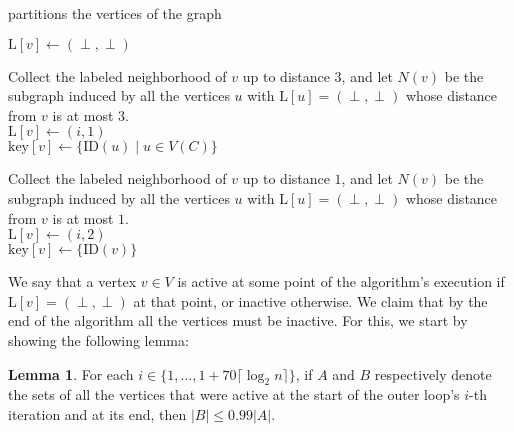 \documentclass{article}
\theoremstyle{definition}
\newtheorem{lemma}{Lemma}[section]
\begin{document}
\begin{algorithm}[H]\label{AlgPartition}\small
	\caption{partitions the vertices of the graph}
\SetInd{1em}{0em}
$\text{L}[v] \gets (\perp, \perp)$\\

	 { \label{alg:outer}

            Collect the labeled neighborhood of $v$ up to distance $3$, and let $N(v)$ be the subgraph induced by all the vertices $u$ with $\text{L}[u] = (\perp, \perp)$ whose distance from $v$ is at most $3$. \\
                    {$\text{L}[v] \gets (i,1)$ \\
                    $\text{key}[v] \gets \{\text{ID}(u) \mid u \in V(C)  \}$} \smallskip

            Collect the labeled neighborhood of $v$ up to distance $1$, and let $N(v)$ be the subgraph induced by all the vertices $u$ with $\text{L}[u] = (\perp, \perp)$ whose distance from $v$ is at most $1$. \\
             {\label{removeLowDeg} $\text{L}[v] \gets (i,2)$ \\$\text{key}[v] \gets \{\text{ID}(v)\}$
  }
    }
\label{alg:partitionToLevels}
\end{algorithm}\medskip \smallskip

We say that a vertex $v \in V$ is active at some point of the algorithm's execution if $\text{L}[v] = (\perp, \perp)$ at that point, or inactive otherwise. We claim that by the end of the algorithm all the vertices must be inactive. For this, we start by showing the following lemma:

\begin{lemma} For each $i \in \{1,...,1+70\lceil\log_{2}n\rceil\}$, if $A$ and $B$ respectively denote the sets of all the vertices that were active at the start of the outer loop's $i$-th iteration and at its end, then $|B| \le 0.99|A|$.\label{lem:numberOfVerticesDeactivates}\end{lemma}
\end{document}
